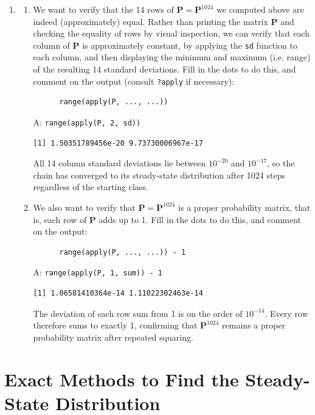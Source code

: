\documentclass{article}
\begin{document}
\begin{enumerate}
  \item [$\boldsymbol{Q}_2$]
    \begin{enumerate}
      \item [(a)] We want to verify that the 14 rows of $\mathbf{P} = \mathbf{P}^{1024}$ we computed above are indeed (approximately) equal. Rather than printing the matrix $\mathbf{P}$ and checking the equality of rows by visual inspection, we can verify that each column of $\mathbf{P}$ is approximately constant, by applying the \texttt{sd} function to each column, and then displaying the minimum and maximum (i.e. range) of the resulting 14 standard deviations. Fill in the dots to do this, and comment on the output (consult \texttt{?apply} if necessary):
      \begin{lstlisting}
      range(apply(P, ..., ...))
      \end{lstlisting}
      A: \lstinline|range(apply(P, 2, sd))|
\begin{lstlisting}
[1] 1.50351789456e-20 9.73730006967e-17
\end{lstlisting}
      All 14 column standard deviations lie between $10^{-20}$ and $10^{-17}$, so the chain has converged to its steady-state distribution after 1024 steps regardless of the starting class.
      \item [(b)] We also want to verify that $\mathbf{P} = \mathbf{P}^{1024}$ is a proper probability matrix, that is, each row of $\mathbf{P}$ adds up to 1. Fill in the dots to do this, and comment on the output:
      \begin{lstlisting}
      range(apply(P, ..., ...)) - 1
      \end{lstlisting}
      A: \lstinline|range(apply(P, 1, sum)) - 1|
\begin{lstlisting}
[1] 1.06581410364e-14 1.11022302463e-14
\end{lstlisting}
The deviation of each row sum from 1 is on the order of $10^{-14}$. Every row therefore sums to exactly 1, confirming that $\mathbf{P}^{1024}$ remains a proper probability matrix after repeated squaring.
    \end{enumerate}
\end{enumerate}
\clearpage
 
\section{Exact Methods to Find the Steady-State Distribution}
 
\end{document}
